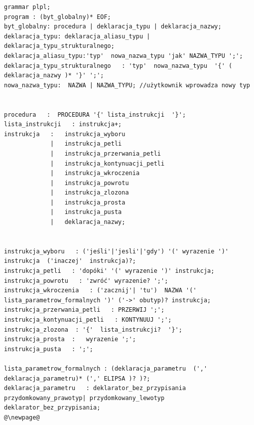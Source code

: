
\lstset{
    escapechar=@,
    breaklines=true
}
\begin{lstlisting}[basicstyle=\scriptsize\ttfamily,breaklines=true]
grammar plpl;
program : (byt_globalny)* EOF;
byt_globalny: procedura | deklaracja_typu | deklaracja_nazwy;
deklaracja_typu: deklaracja_aliasu_typu | deklaracja_typu_strukturalnego;
deklaracja_aliasu_typu:'typ'  nowa_nazwa_typu 'jak' NAZWA_TYPU ';';
deklaracja_typu_strukturalnego   : 'typ'  nowa_nazwa_typu  '{' ( deklaracja_nazwy )* '}' ';';
nowa_nazwa_typu:  NAZWA | NAZWA_TYPU; //użytkownik wprowadza nowy typ


procedura   :  PROCEDURA '{' lista_instrukcji  '}';
lista_instrukcji   : instrukcja+;
instrukcja   :   instrukcja_wyboru
             |   instrukcja_petli
             |   instrukcja_przerwania_petli
             |   instrukcja_kontynuacji_petli
             |   instrukcja_wkroczenia
             |   instrukcja_powrotu
             |   instrukcja_zlozona
             |   instrukcja_prosta
             |   instrukcja_pusta
             |   deklaracja_nazwy;


instrukcja_wyboru   : ('jeśli'|'jesli'|'gdy') '(' wyrazenie ')' instrukcja  ('inaczej'  instrukcja)?;
instrukcja_petli   : 'dopóki' '(' wyrazenie ')' instrukcja;
instrukcja_powrotu   : 'zwróć' wyrazenie? ';';
instrukcja_wkroczenia   : ('zacznij'| 'tu')  NAZWA '(' lista_parametrow_formalnych ')' ('->' obutyp)? instrukcja;
instrukcja_przerwania_petli   : PRZERWIJ ';';
instrukcja_kontynuacji_petli   : KONTYNUUJ ';';
instrukcja_zlozona  : '{'  lista_instrukcji?  '}';
instrukcja_prosta  :   wyrazenie ';';
instrukcja_pusta   : ';';

lista_parametrow_formalnych : (deklaracja_parametru  (',' deklaracja_parametru)* (',' ELIPSA )? )?;
deklaracja_parametru   : deklarator_bez_przypisania przydomkowany_prawotyp| przydomkowany_lewotyp  deklarator_bez_przypisania;
@\newpage@


\end{lstlisting}
